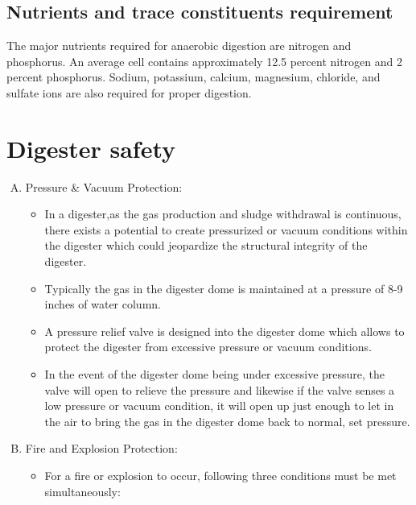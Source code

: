 \subsection{Nutrients and trace constituents requirement}
        The major nutrients required for anaerobic digestion are nitrogen and phosphorus. An average cell contains approximately 12.5 percent nitrogen and 2 percent phosphorus. Sodium, potassium, calcium, magnesium, chloride, and sulfate ions are also required for proper digestion.\\

\section{Digester safety}
\begin{enumerate}[A.]
    \item Pressure \& Vacuum Protection:\\
        \begin{itemize}
            \item In a digester,as the gas production and sludge withdrawal is continuous, there exists a potential to create pressurized or vacuum conditions within the digester which could jeopardize the structural integrity of the digester.  
            \item Typically the gas in the digester dome is maintained at a pressure of 8-9 inches of water column.  
            \item A pressure relief valve is designed into the digester dome which allows to protect the digester from excessive pressure or vacuum conditions.  
            \item In the event of the digester dome being under excessive pressure, the valve will open to relieve the pressure and likewise if the valve senses a low pressure or vacuum condition, it will open up just enough to let in the air to bring the gas in the digester dome back to normal, set pressure.
        \end{itemize}
    \item Fire and Explosion Protection:  \\
        \begin{itemize}
            \item For a fire or explosion to occur, following three conditions must be met simultaneously:\\
                \begin{enumerate} 

\end{enumerate}
\end{itemize}
\end{enumerate}
